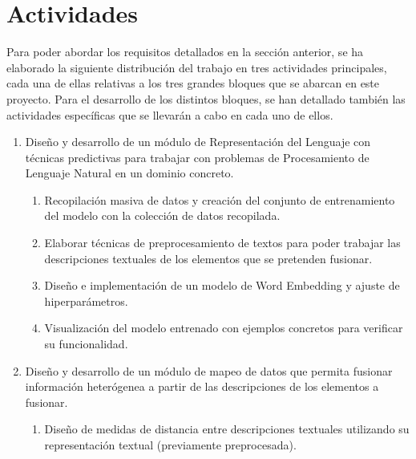 

\section{Actividades}\label{sec:tareas}

Para poder abordar los requisitos detallados en la sección anterior, se ha elaborado la siguiente distribución del trabajo en tres actividades principales, cada una de ellas relativas a los tres grandes bloques que se abarcan en este proyecto. Para el desarrollo de los distintos bloques, se han detallado también las actividades específicas que se llevarán a cabo en cada uno de ellos.
\begin{enumerate}

    \item Diseño y desarrollo de un módulo de Representación del Lenguaje con técnicas predictivas para trabajar con problemas de Procesamiento de Lenguaje Natural en un dominio concreto. %
    
        \begin{enumerate}
            \item Recopilación masiva de datos y creación del conjunto de entrenamiento del modelo con la colección de datos recopilada. 
            
            \item Elaborar técnicas de preprocesamiento de textos para poder trabajar las descripciones textuales de los elementos que se pretenden fusionar.
            
            \item Diseño e implementación de un modelo de Word Embedding y ajuste de hiperparámetros. 
            
            \item Visualización del modelo entrenado con ejemplos concretos para verificar su funcionalidad.
        \end{enumerate}
        
    \item Diseño y desarrollo de un módulo de mapeo de datos que permita fusionar información heterógenea a partir de las descripciones de los elementos a fusionar.
    
        \begin{enumerate}
            \item Diseño de medidas de distancia entre descripciones textuales utilizando su representación textual (previamente preprocesada).


\end{enumerate}
\end{enumerate}
